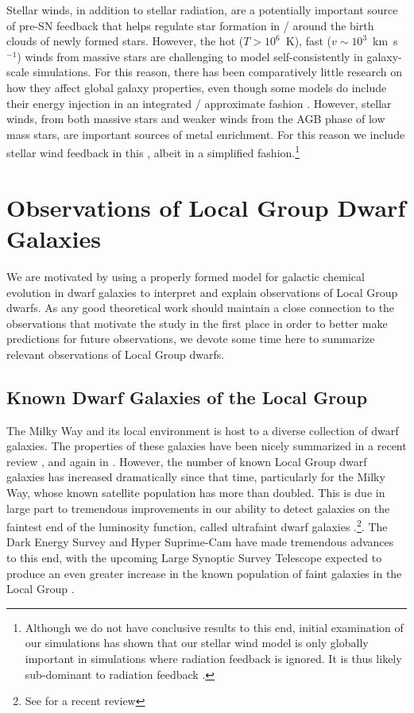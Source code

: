 Stellar winds, in addition to stellar radiation, are a potentially important source of pre-SN feedback that helps regulate star formation in / around the birth clouds of newly formed stars. However, the hot ($T>10^{6}$~K), fast ($v \sim 10^{3}$~km~s$^{-1}$) winds from massive stars \citep{Weaver1977} are challenging to model self-consistently in galaxy-scale simulations. For this reason, there has been comparatively little research on how they affect global galaxy properties, even though some models do include their energy injection in an integrated / approximate fashion \citep[e.g.][]{FIRE}. However, stellar winds, from both massive stars and weaker winds from the AGB phase of low mass stars, are important sources of metal enrichment. For this reason we include stellar wind feedback in this \Dissertation, albeit in a simplified fashion.\footnote{Although we do not have conclusive results to this end, initial examination of our simulations has shown that our stellar wind model is only globally important in simulations where radiation feedback is ignored. It is thus likely sub-dominant to radiation feedback \citep{Abbott1982,McKee1984}.}

\section{Observations of Local Group Dwarf Galaxies}
\label{intro:sec:LG dwarfs}

We are motivated by using a properly formed model for galactic chemical evolution in dwarf galaxies to interpret and explain observations of Local Group dwarfs. As any good theoretical work should maintain a close connection to the observations that motivate the study in the first place in order to better make predictions for future observations, we devote some time here to summarize relevant observations of Local Group dwarfs.

\subsection{Known Dwarf Galaxies of the Local Group}
\label{intro:sec:dwarf galaxies}

The Milky Way and its local environment is host to a diverse collection of dwarf galaxies. The properties of these galaxies have been nicely summarized in a recent review \citep{Tolstoy2009}, and again in \cite{McConnachie2012}. However, the number of known Local Group dwarf galaxies has increased dramatically since that time, particularly for the Milky Way, whose known satellite population has more than doubled. This is due in large part to tremendous improvements in our ability to detect galaxies on the faintest end of the luminosity function, called ultrafaint dwarf galaxies \citep[UFDs,][]{Willman2005}.\footnote{See \cite{Simon2019} for a recent review}. The Dark Energy Survey \citep[e.g.][]{Drlica-Wagner2015} and Hyper Suprime-Cam \citep[e.g.][]{Greco2018} have made tremendous advances to this end, with the upcoming Large Synoptic Survey Telescope expected to produce an even greater increase in the known population of faint galaxies in the Local Group \citep{Haynes2019,Weisz2019}.

